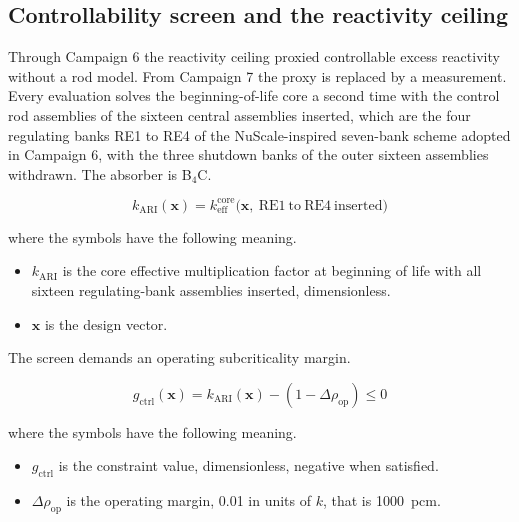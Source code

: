 \subsection{Controllability screen and the reactivity ceiling}
\label{sec:meth-ctrl}

Through Campaign 6 the reactivity ceiling proxied controllable excess
reactivity without a rod model. From Campaign 7 the proxy is replaced
by a measurement. Every evaluation solves the beginning-of-life core a
second time with the control rod assemblies of the sixteen central
assemblies inserted, which are the four regulating banks RE1 to RE4 of
the NuScale-inspired seven-bank scheme adopted in Campaign 6, with the
three shutdown banks of the outer sixteen assemblies withdrawn. The
absorber is B$_4$C.

\begin{equation}
k_\mathrm{ARI}(\mathbf{x}) = k_\mathrm{eff}^\mathrm{core}\big(\mathbf{x},\ \mathrm{RE1\ to\ RE4\ inserted}\big)
\label{eq:k-ari}
\end{equation}

\noindent where the symbols have the following meaning.

\begin{itemize}
  \item $k_\mathrm{ARI}$ is the core effective multiplication factor at
        beginning of life with all sixteen regulating-bank assemblies
        inserted, dimensionless.

  \item $\mathbf{x}$ is the design vector.
\end{itemize}

The screen demands an operating subcriticality margin.

\begin{equation}
g_\mathrm{ctrl}(\mathbf{x}) = k_\mathrm{ARI}(\mathbf{x}) - (1 - \Delta\rho_\mathrm{op}) \le 0
\label{eq:g-ctrl-meth}
\end{equation}

\noindent where the symbols have the following meaning.

\begin{itemize}
  \item $g_\mathrm{ctrl}$ is the constraint value, dimensionless,
        negative when satisfied.

  \item $\Delta\rho_\mathrm{op}$ is the operating margin, \num{0.01} in
        units of $k$, that is \SI{1000}{pcm}.
\end{itemize}

